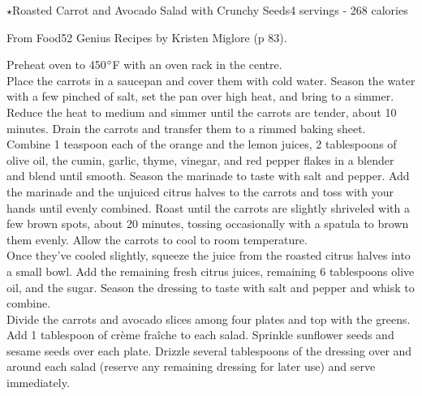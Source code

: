 \begin{recipe}{\texorpdfstring{$\star$}{str}Roasted Carrot and Avocado Salad with Crunchy Seeds}{4 servings - 268 calories}{}

\freeform From {\normalfont Food52 Genius Recipes} by Kristen Miglore (p 83).


Preheat oven to 450$\degree$F with an oven rack in the centre.\\

Place the carrots in a saucepan and cover them with cold water. Season the water with a few pinched of salt, set the pan over high heat, and bring to a simmer. Reduce the heat to medium and simmer until the carrots are tender, about 10 minutes. Drain the carrots and transfer them to a rimmed baking sheet.\\

Combine 1 teaspoon each of the orange and the lemon juices, 2 tablespoons of olive oil, the cumin, garlic, thyme, vinegar, and red pepper flakes in a blender and blend until smooth. Season the marinade to taste with salt and pepper. Add the marinade and the unjuiced citrus halves to the carrots and toss with your hands until evenly combined. Roast until the carrots are slightly shriveled with a few brown spots, about 20 minutes, tossing occasionally with a spatula to brown them evenly. Allow the carrots to cool to room temperature.\\

Once they've cooled slightly, squeeze the juice from the roasted citrus halves into a small bowl. Add the remaining fresh citrus juices, remaining 6 tablespoons olive oil, and the sugar. Season the dressing to taste with salt and pepper and whisk to combine.\\

Divide the carrots and avocado slices among four plates and top with the greens. Add 1 tablespoon of crème fraîche to each salad. Sprinkle sunflower seeds and sesame seeds over each plate. Drizzle several tablespoons of the dressing over and around each salad (reserve any remaining dressing for later use) and serve immediately.

\end{recipe}